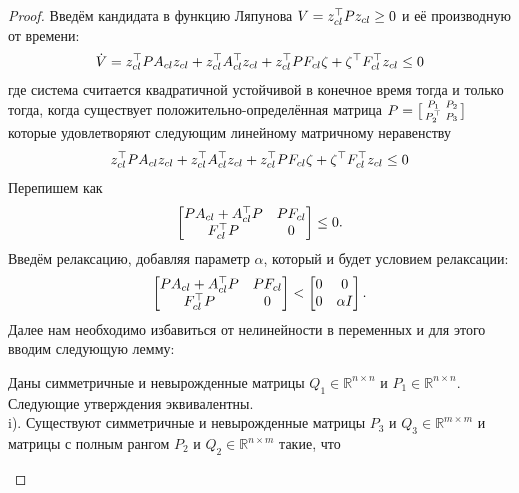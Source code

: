 \begin{proof}
Введём кандидата в функцию Ляпунова ${V} = {z}_{cl}^\top {P}{z}_{cl} \geq 0$ и её производную от времени:
\begin{align}
	{\dot{V}} = {z}_{cl}^\top {P} {A}_{cl} {z}_{cl} +
	{z}_{cl}^\top {A}_{cl}^\top {z}_{cl} 
	+
	{z}_{cl}^\top {P} {F}_{cl} {\zeta} +
	{\zeta}^\top {F}_{cl}^\top {z}_{cl}
	\leq 0
\end{align}
где система считается квадратичной устойчивой в конечное время тогда и только тогда, когда существует положительно-определённая матрица ${P} = \bigl[ \begin{smallmatrix}  {P}_1 & {P}_2 \\ {P}_2^\top & {P}_3 \end{smallmatrix} \bigr]$ которые удовлетворяют следующим линейному матричному неравенству
\begin{align}
	{z}_{cl}^\top {P} {A}_{cl} {z}_{cl} +
	{z}_{cl}^\top {A}_{cl}^\top {z}_{cl} 
	+
	{z}_{cl}^\top {P} {F}_{cl} {\zeta} +
	{\zeta}^\top {F}_{cl}^\top {z}_{cl}
	\leq 0
\end{align}
Перепишем как
\begin{align}
	\begin{bmatrix}
		{P} {A}_{cl} + {A}_{cl}^\top {P} & {P} {F}_{cl} \\
		{F}_{cl} ^\top {P} & 0
	\end{bmatrix} \leq 0.
\end{align}
Введём релаксацию, добавляя параметр $\alpha$, который и будет условием релаксации:
\begin{align}\label{eq: S procedure}
	\begin{bmatrix}
		{P} {A}_{cl} + {A}_{cl}^\top {P} & {P} {F}_{cl} \\
		{F}_{cl} ^\top {P} & 0
	\end{bmatrix} < 
	\begin{bmatrix}
		0 & 0\\
		0 & \alpha {I}
	\end{bmatrix}.
\end{align}
Далее нам необходимо избавиться от нелинейности в переменных и для этого вводим следующую лемму:
\begin{lemma}
	Даны симметричные и невырожденные матрицы ${Q}_{1} \in \mathbb{R}^{n\times n}$ и ${P}_{1} \in \mathbb{R}^{n\times n}$. Следующие утверждения эквивалентны.\\
	
	i). Существуют симметричные и невырожденные матрицы  ${P}_{3}$ и ${Q}_{3} \in \mathbb{R}^{m\times m}$ и матрицы с полным рангом ${P}_{2}$ и ${Q}_{2} \in \mathbb{R}^{n\times m}$ такие, что
	

\end{lemma}
\end{proof}

